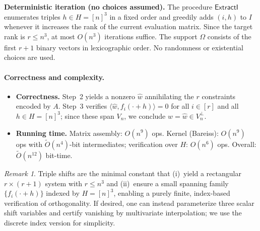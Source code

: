 \documentclass[12pt]{article}
\theoremstyle{definition}
\theoremstyle{definition}
\theoremstyle{remark}
\newtheorem{remark}{Remark}
\theoremstyle{remark}
\begin{document}
\textbf{Deterministic iteration (no choices assumed).} The procedure $\mathsf{ExtractI}$ enumerates
triples $h\in H=[n]^3$ in a fixed order and greedily adds $(i,h)$ to $I$ whenever it increases
the rank of the current evaluation matrix. Since the target rank is $r\le n^3$, at most $O(n^3)$
iterations suffice. The support $\Omega$ consists of the first $r+1$ binary vectors in lexicographic order. No randomness or existential choices are used.

\paragraph{Correctness and complexity.}

\begin{itemize}
\item \textbf{Correctness.} Step~2 yields a nonzero $\hat w$ annihilating the $r$ constraints encoded by $A$. Step~3 verifies $\langle \hat w, f_i(\cdot+h)\rangle=0$ for all $i\in[r]$ and all $h\in H=[n]^3$; since these span $V_n$, we conclude $w=\hat w\in V_n^{\perp}$.

\item \textbf{Running time.} Matrix assembly: $O(n^9)$ ops. Kernel (Bareiss): $O(n^9)$ ops with $\tilde O(n^4)$-bit intermediates; verification over $H$: $O(n^6)$ ops. Overall: $\tilde O(n^{12})$ bit-time.
\end{itemize}

\begin{remark}
Triple shifts are the minimal constant that (i)~yield a rectangular $r\times(r+1)$ system with $r\le n^3$ and (ii)~ensure a small spanning family $\{f_i(\cdot+h)\}$ indexed by $H=[n]^3$, enabling a purely finite, index-based verification of orthogonality. If desired, one can instead parameterize three scalar shift variables and certify vanishing by multivariate interpolation; we use the discrete index version for simplicity.
\end{remark}
\end{document}
